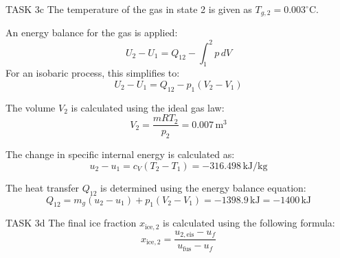 TASK 3c  
The temperature of the gas in state 2 is given as \( T_{g,2} = 0.003^\circ\text{C} \).  

An energy balance for the gas is applied:  
\[
U_2 - U_1 = Q_{12} - \int_{1}^{2} p \, dV
\]  
For an isobaric process, this simplifies to:  
\[
U_2 - U_1 = Q_{12} - p_1 (V_2 - V_1)
\]  

The volume \( V_2 \) is calculated using the ideal gas law:  
\[
V_2 = \frac{m R T_2}{p_2} = 0.007 \, \text{m}^3
\]  

The change in specific internal energy is calculated as:  
\[
u_2 - u_1 = c_V (T_2 - T_1) = -316.498 \, \text{kJ/kg}
\]  

The heat transfer \( Q_{12} \) is determined using the energy balance equation:  
\[
Q_{12} = m_g (u_2 - u_1) + p_1 (V_2 - V_1) = -1398.9 \, \text{kJ} = -1400 \, \text{kJ}
\]  

TASK 3d  
The final ice fraction \( x_{\text{ice},2} \) is calculated using the following formula:  
\[
x_{\text{ice},2} = \frac{u_{2,\text{eis}} - u_f}{u_{\text{fus}} - u_f}
\]  